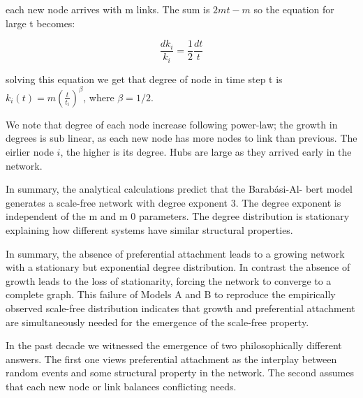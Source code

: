 each new node arrives with m links. The sum is $2mt - m$ so the equation for large t becomes:

\begin{equation}
\frac{dk_i}{k_i} = \frac{1}{2}\frac{dt}{t}
\end{equation}

solving this equation we get that degree of node in time step t is $k_i(t)=m(\frac{t}{t_i})^\beta$, where $\beta=1/2$. 

We note that degree of each node increase following power-law; the growth in degrees is sub linear, as each new node has more nodes to link than previous. The eirlier node $i$, the higher is its degree. Hubs are large as they arrived early in the network. 

In summary, the analytical calculations predict that the Barabási-Al-
bert model generates a scale-free network with degree exponent 3. The degree exponent is independent of the m and m 0 parameters. The degree distribution is stationary explaining how different systems have similar structural properties. 

In summary, the absence of preferential attachment leads to a growing network with a stationary but exponential degree distribution. In contrast the absence of growth leads to the loss of stationarity, forcing the network to converge to a complete graph. This failure of Models A and B to reproduce the empirically observed scale-free distribution indicates that growth and
preferential attachment are simultaneously needed for the emergence of the scale-free property.

In the past decade we witnessed the emergence of two philosophically different answers. The first one views preferential attachment as the interplay between random events and some structural property in the network. The second assumes that each new node or link balances conflicting needs. 

